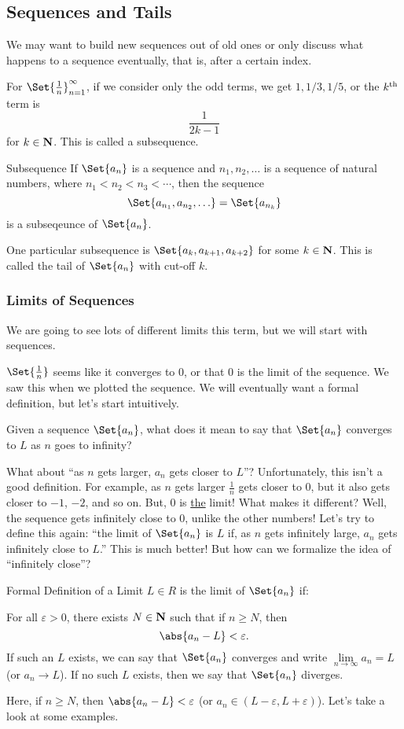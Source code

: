 \subsection{Sequences and Tails}
We may want to build new sequences out of old ones or only discuss what happens to a sequence eventually, that is, after a certain index.
\begin{Example}{}{}
    For $ \Set{\frac{1}{n}}_{n=1}^{\infty} $, if we consider only the odd terms, we get $ 1,1/3,1/5 $, or the $ k\textsuperscript{th} $
    term is
    \[ \frac{1}{2k-1} \]
    for $ k\in\mathbf{N} $.
    This is called a subsequence.
\end{Example}
\begin{Definition}{Subsequence}{}
    If $ \Set{a_n} $ is a sequence and $ {n_1,n_2,\ldots} $ is a sequence of natural numbers, where
    $ n_1<n_2<n_3<\cdots $, then the sequence
    \[ \Set{a_{n_1},a_{n_2},\ldots}=\Set{a_{n_k}} \]
    is a subseqeunce of $ \Set{a_n} $.
\end{Definition}
One particular subsequence is $ \Set{a_k,a_{k+1},a_{k+2}} $ for some $ k\in\mathbf{N} $.
This is called the tail of $ \Set{a_n} $ with cut-off $ k $.

\subsubsection{Limits of Sequences}
We are going to see lots of different limits this term, but we will start with sequences.
\begin{Example}{}{}
    $ \Set{\frac{1}{n}} $ seems like it converges to $ 0 $, or that $ 0 $ is the limit of the sequence.
    We saw this when we plotted the sequence. We will eventually want a formal definition, but let's start intuitively.
\end{Example}
Given a sequence $ \Set{a_n} $, what does it mean to say that $ \Set{a_n} $ converges to $ L $
as $ n $ goes to infinity?

What about ``as $ n $ gets larger, $ a_n $ gets closer to $ L $''? Unfortunately, this isn't a good definition. For example, as $ n $
gets larger $ \frac{1}{n} $ gets closer to $ 0 $, but it also gets closer to $ -1 $, $ -2 $, and so on. But, $ 0 $
is \underline{the} limit! What makes it different? Well, the sequence gets infinitely close to $ 0 $,
unlike the other numbers! Let's try to define this again: ``the limit of $ \Set{a_n} $ is $ L $
if, as $ n $ gets infinitely large, $ a_n $ gets infinitely close to $ L $.'' This is much better!
But how can we formalize the idea of ``infinitely close''?
\begin{Definition}{Formal Definition of a Limit}{}
    $ L\in R $ is the limit of $ \Set{a_n} $ if:

    For all $ \varepsilon>0 $, there exists $ N\in \mathbf{N} $ such that if $ n\ge N $, then
    \[ \abs{a_n-L}<\varepsilon. \]
    If such an $ L $ exists, we can say that $ \Set{a_n} $ converges and write $ \lim\limits_{{n} \to {\infty}}a_n=L $ (or $ a_n\to L $).
    If no such $ L $ exists, then we say that $ \Set{a_n} $ diverges.
\end{Definition}
Here, if $ n\ge N $, then $ \abs{a_n-L}<\varepsilon $ (or $ a_n\in(L-\varepsilon,L+\varepsilon) $). Let's take a look at some examples.

